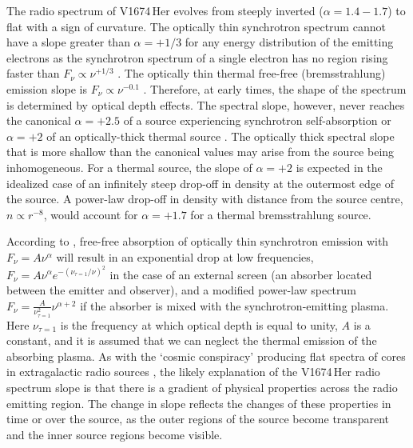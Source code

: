 \documentclass[a4paper,fleqn,usenatbib]{mnras}
\newcommand{\nova}{V1674\,Her}
\begin{document}
The radio spectrum of \nova{} evolves from steeply inverted ($\alpha = 1.4-1.7$) to flat with a sign of curvature. 
%
The optically thin synchrotron spectrum cannot have a slope greater than $\alpha = +1/3$
for any energy distribution of the emitting electrons as the synchrotron spectrum of 
a single electron has no region rising faster than $F_\nu \propto \nu^{+1/3}$ 
\citep{1965ARA&A...3..297G,1966AuJPh..19..195K,1979tpa..book.....G}.
The optically thin thermal free-free (bremsstrahlung) emission slope is $F_\nu \propto \nu^{-0.1}$ \citep{1970ranp.book.....P}.
Therefore, at early times, the shape of the spectrum is
determined by optical depth effects.
%
The spectral slope, however, never reaches the canonical $\alpha = +2.5$ of 
a source experiencing synchrotron self-absorption \citep{1970ranp.book.....P}
or $\alpha = +2$ of an optically-thick thermal source \citep{2013LNP...873.....G}. 
The optically thick spectral slope that is more shallow than the canonical
values may arise from the source being inhomogeneous. For a thermal source,
the slope of $\alpha = +2$ is expected in the idealized case of an infinitely steep drop-off 
in density at the outermost edge of the source. A power-law drop-off in
density with distance from the source centre, $n \propto r^{-8}$, would
account for $\alpha = +1.7$ for a thermal bremsstrahlung source.

According to \cite{1966AuJPh..19..195K}, free-free absorption of optically thin synchrotron emission
with $F_\nu = A \nu^\alpha$ will result in an exponential drop at low
frequencies, $F_\nu = A \nu^\alpha e^{-(\nu_{\tau=1}/\nu)^2}$ 
in the case of an external screen 
(an absorber located between the emitter and observer), 
and a modified power-law spectrum
$F_\nu = \frac{A}{\nu_{\tau=1}^2} \nu^{\alpha+2}$ if the absorber is mixed
with the synchrotron-emitting plasma. Here $\nu_{\tau=1}$ is the frequency
at which optical depth is equal to unity, $A$ is a constant, and it is
assumed that we can neglect the thermal emission of the absorbing plasma.
%
As with the `cosmic conspiracy' producing flat
spectra of cores in extragalactic radio sources \citep{1979ApJ...232...34B,1980Natur.288...12M,1981ApJ...243..700K}, 
the likely explanation of the \nova{} radio spectrum slope is that there is a gradient of physical 
properties across the radio emitting region. 
The change in slope reflects the changes of these properties in time or over 
the source,  as the outer regions of 
the source become transparent and the inner source regions become visible.
\end{document}
